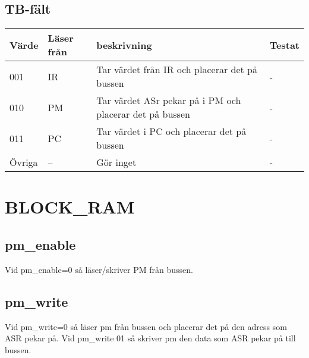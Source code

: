 \documentclass[titlepage, a4paper]{article}
\begin{document}
\subsection{TB-fält}
\begin{table}[H]
  \centering
  \begin{tabular}{|l|l|l|l|}
    \hline
    \textbf{Värde} & \textbf{Läser från} & \textbf{beskrivning} & \textbf{Testat} \\ \hline
     001 & IR & Tar värdet från IR och placerar det på bussen &- \\ \hline
  010 & PM & Tar värdet ASr pekar på i PM och placerar det på bussen &- \\ \hline
   011 & PC & Tar värdet i PC och placerar det på bussen &- \\ \hline
      Övriga & -- & Gör inget &- \\ \hline
  \end{tabular}
\end{table}


\section{BLOCK\_RAM}
\subsection{pm\_enable}
Vid pm\_enable=0 så läser/skriver PM från bussen.
\subsection{pm\_write}
Vid pm\_write=0 så läser pm från bussen och placerar det på den adress som ASR pekar på.
Vid pm\_write 01 så skriver pm den data som ASR pekar på till bussen. 
\end{document}
